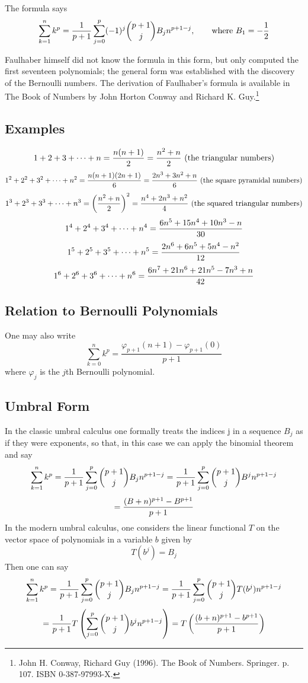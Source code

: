 \documentclass[10pt]{report}
\begin{document}
The formula says
$$\sum_{k=1}^n k^p = {1 \over p+1} \sum_{j=0}^p (-1)^j{p+1 \choose j} B_j n^{p+1-j},\qquad \mbox{where}~B_1 = -\frac{1}{2}$$

Faulhaber himself did not know the formula in this form, but only computed the first seventeen polynomials; the general form was established with the discovery of the Bernoulli numbers. The derivation of Faulhaber's formula is available in The Book of Numbers by John Horton Conway and Richard K. Guy.\footnote{John H. Conway, Richard Guy (1996). The Book of Numbers. Springer. p. 107. ISBN 0-387-97993-X.}
\subsection{Examples}
$$1 + 2 + 3 + \cdots + n = {n(n+1) \over 2} = {n^2 + n \over 2} \text{ (the triangular numbers)}$$
$$1^2 + 2^2 + 3^2 + \cdots + n^2 = {n(n+1)(2n+1) \over 6} = {2n^3 + 3n^2 + n \over 6} \text{ (the square pyramidal numbers)}$$
$$1^3 + 2^3 + 3^3 + \cdots + n^3 = \left({n^2 + n \over 2}\right)^2 = {n^4 + 2n^3 + n^2 \over 4} \text{ (the squared triangular numbers)}$$
$$1^4 + 2^4 + 3^4 + \cdots + n^4 = {6n^5 + 15n^4 + 10n^3 - n \over 30}$$
$$1^5 + 2^5 + 3^5 + \cdots + n^5 = {2n^6 + 6n^5 + 5n^4 - n^2 \over 12}$$
$$1^6 + 2^6 + 3^6 + \cdots + n^6 = {6n^7 + 21n^6 + 21n^5 -7n^3 + n \over 42}$$ 
\subsection{Relation to Bernoulli Polynomials}
One may also write
$$\sum_{k=0}^{n} k^p = \frac{\varphi_{p+1}(n+1)-\varphi_{p+1}(0)}{p+1}$$
where $\varphi_j$ is the $j$th Bernoulli polynomial.
\subsection{Umbral Form}
In the classic umbral calculus one formally treats the indices j in a sequence $B_j$ as if they were exponents, so that, in this case we can apply the binomial theorem and say
$$\sum_{k=1}^n k^p = {1 \over p+1} \sum_{j=0}^p {p+1 \choose j} B_j n^{p+1-j} = {1 \over p+1} \sum_{j=0}^p {p+1 \choose j} B^j n^{p+1-j}$$ 
$$= {(B+n)^{p+1} - B^{p+1} \over p+1}$$ 
In the modern umbral calculus, one considers the linear functional $T$ on the vector space of polynomials in a variable $b$ given by
$$T(b^j) = B_j$$
Then one can say
$$\sum_{k=1}^n k^p = {1 \over p+1} \sum_{j=0}^p {p+1 \choose j} B_j n^{p+1-j} = {1 \over p+1} \sum_{j=0}^p {p+1 \choose j} T(b^j) n^{p+1-j}$$ 
$$= {1 \over p+1} T\left(\sum_{j=0}^p {p+1 \choose j} b^j n^{p+1-j} \right) = T\left({(b+n)^{p+1} - b^{p+1} \over p+1}\right)$$ 
\end{document}
